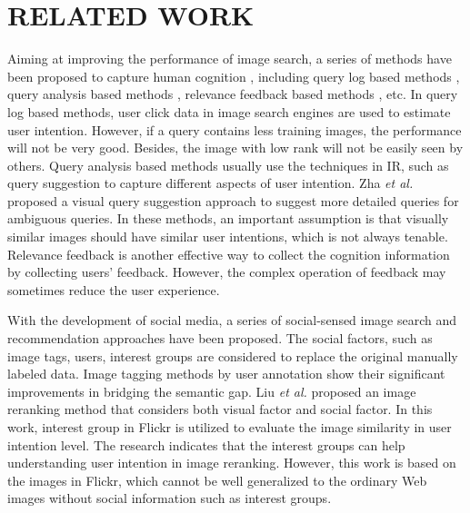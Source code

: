 \vspace{-0.4cm}\section{RELATED WORK}
Aiming at improving the performance of image search, a series of methods have been proposed to capture human cognition , including query log based methods \cite{click1,  click_bing}, query analysis based methods \cite{query_ana1,mingdong}, relevance feedback based methods \cite{rf, attribute_feedback}, etc. In query log based methods, user click data in image search engines are used to estimate user intention. However, if a query contains less training images, the performance will not be very good. Besides, the image with low rank will not be easily seen by others. Query analysis based methods usually use the techniques in IR, such as query suggestion to capture different aspects of user intention. Zha \emph{et al.} proposed a visual query suggestion approach \cite{visual_suggestion} to suggest more detailed queries for ambiguous queries. In these methods, an important assumption is that visually similar images should have similar user intentions, which is not always tenable. Relevance feedback is another effective way to collect the cognition information by collecting users' feedback. However, the complex operation of feedback may sometimes reduce the user experience.

With the development of social media, a series of social-sensed image search and recommendation approaches have been proposed\cite{cui2014}. The social factors, such as image tags, users, interest groups are considered to replace the original manually labeled data. Image tagging methods \cite{tag1} by user annotation show their significant improvements in bridging the semantic gap. Liu \emph{et al.} proposed an image reranking method \cite{social_visual} that considers both visual factor\cite{zheng2013visual,zhiwang} and social factor. In this work, interest group in Flickr is utilized to evaluate the image similarity in user intention level. The research indicates that the interest groups can help understanding user intention in image reranking. However, this work is based on the images in Flickr, which cannot be well generalized to the ordinary Web images without social information such as interest groups.

